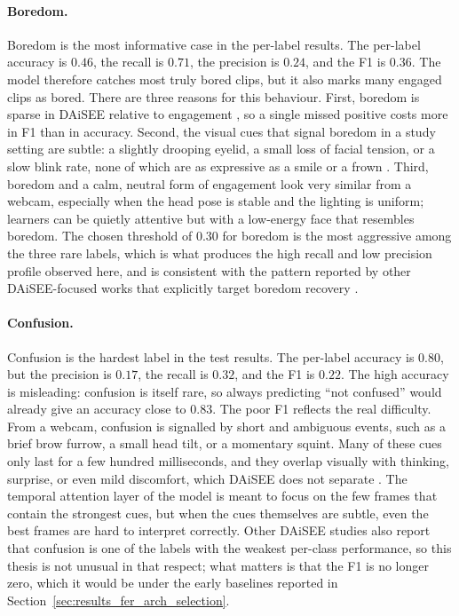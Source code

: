 \paragraph{Boredom.} Boredom is the most informative case in the per-label results. The per-label accuracy is $0.46$, the recall is $0.71$, the precision is $0.24$, and the F1 is $0.36$. The model therefore catches most truly bored clips, but it also marks many engaged clips as bored. There are three reasons for this behaviour. First, boredom is sparse in DAiSEE relative to engagement \cite{gupta_daisee_2016,abedi_improving_2021}, so a single missed positive costs more in F1 than in accuracy. Second, the visual cues that signal boredom in a study setting are subtle: a slightly drooping eyelid, a small loss of facial tension, or a slow blink rate, none of which are as expressive as a smile or a frown \cite{dmello_language_2012,santoni_convolutional_2023}. Third, boredom and a calm, neutral form of engagement look very similar from a webcam, especially when the head pose is stable and the lighting is uniform; learners can be quietly attentive but with a low-energy face that resembles boredom. The chosen threshold of $0.30$ for boredom is the most aggressive among the three rare labels, which is what produces the high recall and low precision profile observed here, and is consistent with the pattern reported by other DAiSEE-focused works that explicitly target boredom recovery \cite{santoni_convolutional_2023,rianto_engagement_2025}.

\paragraph{Confusion.} Confusion is the hardest label in the test results. The per-label accuracy is $0.80$, but the precision is $0.17$, the recall is $0.32$, and the F1 is $0.22$. The high accuracy is misleading: confusion is itself rare, so always predicting ``not confused'' would already give an accuracy close to $0.83$. The poor F1 reflects the real difficulty. From a webcam, confusion is signalled by short and ambiguous events, such as a brief brow furrow, a small head tilt, or a momentary squint. Many of these cues only last for a few hundred milliseconds, and they overlap visually with thinking, surprise, or even mild discomfort, which DAiSEE does not separate \cite{gupta_daisee_2016,dmello_language_2012}. The temporal attention layer of the model is meant to focus on the few frames that contain the strongest cues, but when the cues themselves are subtle, even the best frames are hard to interpret correctly. Other DAiSEE studies also report that confusion is one of the labels with the weakest per-class performance, so this thesis is not unusual in that respect; what matters is that the F1 is no longer zero, which it would be under the early baselines reported in Section~\ref{sec:results_fer_arch_selection}.

